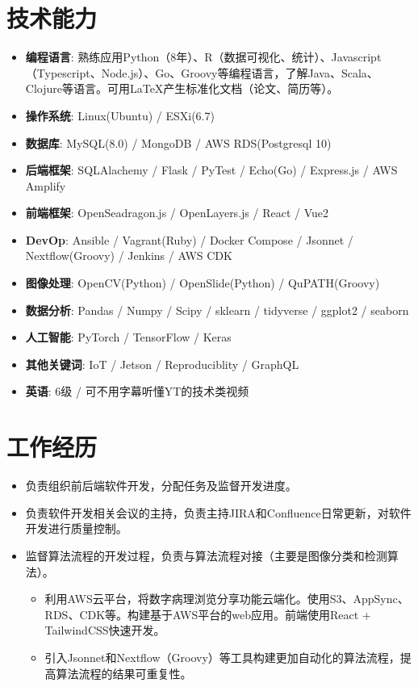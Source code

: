 \documentclass{resume}
\begin{document}
\section{技术能力}
\begin{itemize}[parsep=0.2ex]
  \item \textbf{编程语言}: 熟练应用Python（8年）、R（数据可视化、统计）、Javascript（Typescript、Node.js）、Go、Groovy等编程语言，了解Java、Scala、Clojure等语言。可用\LaTeX{}产生标准化文档（论文、简历等）。
  \item \textbf{操作系统}: Linux(Ubuntu) / ESXi(6.7)
  \item \textbf{数据库}: MySQL(8.0) / MongoDB / AWS RDS(Postgresql 10)
  \item \textbf{后端框架}: SQLAlachemy / Flask / PyTest / Echo(Go) / Express.js / AWS Amplify
  \item \textbf{前端框架}: OpenSeadragon.js / OpenLayers.js / React / Vue2
  \item \textbf{DevOp}: Ansible / Vagrant(Ruby) / Docker Compose / Jsonnet / Nextflow(Groovy) / Jenkins / AWS CDK
  \item \textbf{图像处理}: OpenCV(Python) / OpenSlide(Python) / QuPATH(Groovy)
  \item \textbf{数据分析}: Pandas / Numpy / Scipy / sklearn / tidyverse / ggplot2 / seaborn
  \item \textbf{人工智能}: PyTorch / TensorFlow / Keras
  \item \textbf{其他关键词}: IoT / Jetson / Reproduciblity / GraphQL
  \item \textbf{英语}: 6级 / 可不用字幕听懂YT的技术类视频
\end{itemize}


\section{工作经历}
\begin{itemize}
  \item 负责组织前后端软件开发，分配任务及监督开发进度。
  \item 负责软件开发相关会议的主持，负责主持JIRA和Confluence日常更新，对软件开发进行质量控制。
  \item 监督算法流程的开发过程，负责与算法流程对接（主要是图像分类和检测算法）。
    \begin{itemize}
    \item 利用AWS云平台，将数字病理浏览分享功能云端化。使用S3、AppSync、RDS、CDK等。构建基于AWS平台的web应用。前端使用React + TailwindCSS快速开发。
    \item 引入Jsonnet和Nextflow（Groovy）等工具构建更加自动化的算法流程，提高算法流程的结果可重复性。
    \end{itemize}
\end{itemize}
\end{document}
